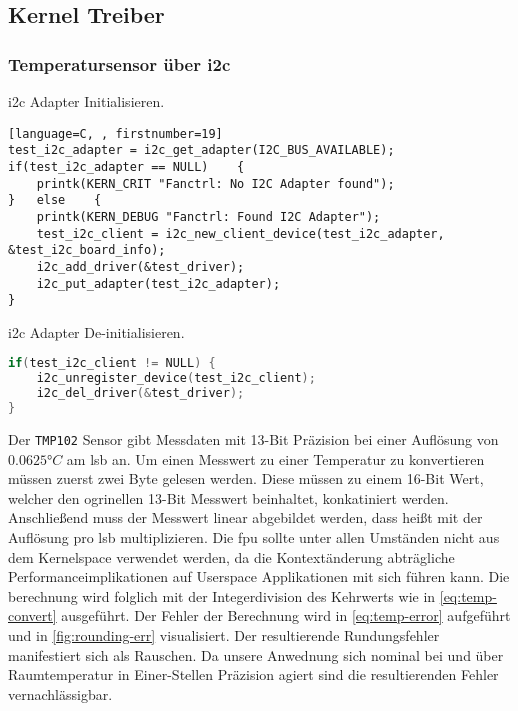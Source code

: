 \subsection{Kernel Treiber}
\subsubsection{Temperatursensor über \acrshort{i2c}}

\Gls{i2c} Adapter Initialisieren.
\begin{lstlisting}[language=C, , firstnumber=19]
test_i2c_adapter = i2c_get_adapter(I2C_BUS_AVAILABLE);
if(test_i2c_adapter == NULL)	{
    printk(KERN_CRIT "Fanctrl: No I2C Adapter found");
}	else	{
    printk(KERN_DEBUG "Fanctrl: Found I2C Adapter");
    test_i2c_client = i2c_new_client_device(test_i2c_adapter, &test_i2c_board_info);
    i2c_add_driver(&test_driver);
    i2c_put_adapter(test_i2c_adapter);
}
\end{lstlisting}

\Gls{i2c} Adapter De-initialisieren.
\begin{lstlisting}[language=C, firstnumber=31]
if(test_i2c_client != NULL)	{
    i2c_unregister_device(test_i2c_client);
    i2c_del_driver(&test_driver);
}
\end{lstlisting}

Der \texttt{TMP102} Sensor gibt Messdaten mit 13-Bit Präzision bei einer Auflösung von $0.0625\si{\degree C}$ am \gls{lsb} an.
Um einen Messwert zu einer Temperatur zu konvertieren müssen zuerst zwei Byte gelesen werden.
Diese müssen zu einem 16-Bit Wert, welcher den ogrinellen 13-Bit Messwert beinhaltet, konkatiniert werden.
Anschlie{\ss}end muss der Messwert linear abgebildet werden, dass hei{\ss}t mit der Auflösung pro \gls{lsb} multiplizieren.
Die \gls{fpu} sollte unter allen Umständen nicht aus dem Kernelspace verwendet werden,
da die Kontextänderung abträgliche Performanceimplikationen auf Userspace Applikationen mit sich führen kann.
Die berechnung wird folglich mit der Integerdivision des Kehrwerts wie in \autoref{eq:temp-convert} ausgeführt.
Der Fehler der Berechnung wird in \autoref{eq:temp-error} aufgeführt und in \autoref{fig:rounding-err} visualisiert.
Der resultierende Rundungsfehler manifestiert sich als Rauschen.
Da unsere Anwednung sich nominal bei und über Raumtemperatur in Einer-Stellen Präzision agiert sind die resultierenden Fehler vernachlässigbar.

